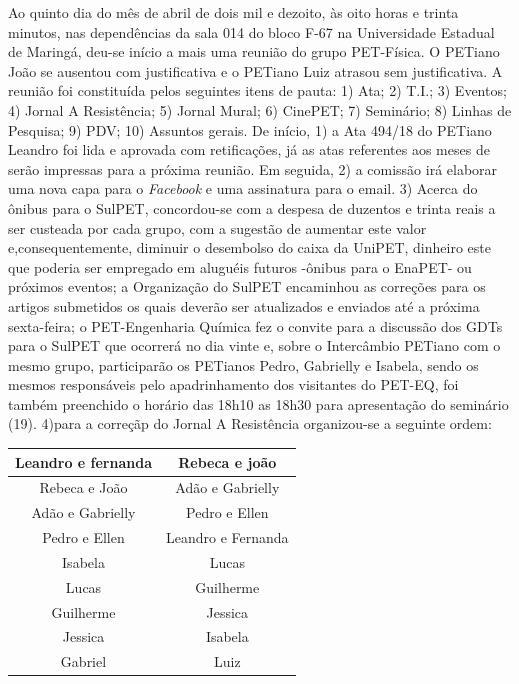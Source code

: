 \documentclass[a4paper,12pt]{report}
\begin{document}
Ao quinto dia do mês de abril de dois mil e dezoito, 
às oito horas e trinta minutos, nas dependências da sala 014 do bloco F-67 na Universidade Estadual de Maringá, deu-se início a mais uma reunião do grupo PET-Física. O PETiano João se ausentou com justificativa e o PETiano Luiz atrasou sem justificativa. A reunião foi constituída pelos seguintes itens de pauta: 
1) Ata;
2) T.I.;
3) Eventos;
4) Jornal A Resistência;
5) Jornal Mural; 
6) CinePET; 
7) Seminário; 
8) Linhas de Pesquisa; 
9) PDV; 
10) Assuntos gerais. 
De início, 
1) a Ata 494/18 do PETiano Leandro foi lida e aprovada com retificações, já as atas referentes aos meses de serão impressas para a próxima reunião. 
Em seguida, 
2) a comissão irá elaborar uma nova capa para o {\itshape Facebook} e uma assinatura para o email.  
3) Acerca do ônibus para o SulPET, concordou-se com a despesa de duzentos e trinta reais a ser custeada por cada grupo, com a sugestão de aumentar este valor e,consequentemente, diminuir o desembolso do caixa da UniPET, dinheiro este que poderia ser empregado em aluguéis futuros -ônibus para o EnaPET- ou próximos eventos; a Organização do SulPET encaminhou as correções para os artigos submetidos    
os quais deverão ser atualizados e enviados até a próxima sexta-feira; o PET-Engenharia Química fez o convite para a discussão dos GDTs para o SulPET que ocorrerá no dia vinte e, sobre o Intercâmbio PETiano com o mesmo grupo, participarão os PETianos Pedro, Gabrielly e Isabela, sendo os mesmos responsáveis pelo apadrinhamento dos visitantes do PET-EQ, foi também preenchido o horário das 18h10 as 18h30  para apresentação do seminário (19).
4)para a correçãp do Jornal A Resistência organizou-se a seguinte ordem:

\begin{table} [h!]
\centering
\begin{tabular}{|	c	|	c	|}
\hline
Leandro e fernanda		&  Rebeca e joão    	\\ \hline
Rebeca e João           & Adão e Gabrielly  	\\ \hline
Adão e Gabrielly        & Pedro e Ellen  		\\ \hline
Pedro e Ellen           & Leandro e Fernanda 	\\ \hline
Isabela					& Lucas 				\\ \hline
Lucas					& Guilherme 			\\ \hline
Guilherme 				& Jessica 				\\ \hline
Jessica 				& Isabela				\\ \hline
Gabriel					& Luiz 					\\ \hline
\end{tabular}
\end{table}
\end{document}
